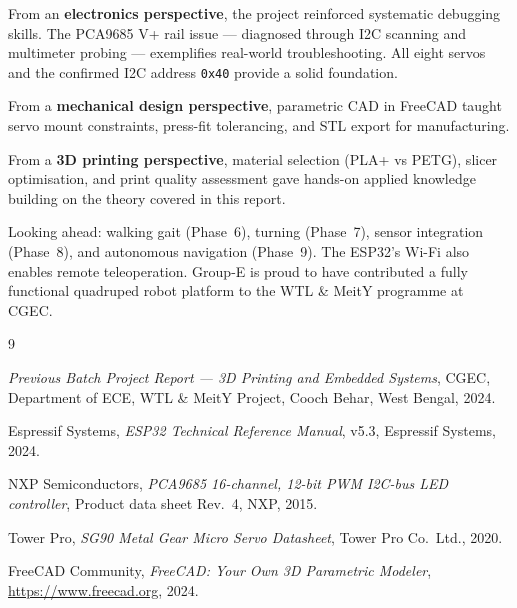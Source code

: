 \documentclass[12pt, a4paper]{article}
\begin{document}
From an \textbf{electronics perspective}, the project reinforced systematic
debugging skills. The PCA9685 V+ rail issue --- diagnosed through I2C scanning
and multimeter probing --- exemplifies real-world troubleshooting. All eight
servos and the confirmed I2C address \texttt{0x40} provide a solid foundation.

From a \textbf{mechanical design perspective}, parametric CAD in FreeCAD taught
servo mount constraints, press-fit tolerancing, and STL export for manufacturing.

From a \textbf{3D printing perspective}, material selection (PLA+ vs PETG),
slicer optimisation, and print quality assessment gave hands-on applied knowledge
building on the theory covered in this report.

Looking ahead: walking gait (Phase~6), turning (Phase~7), sensor integration
(Phase~8), and autonomous navigation (Phase~9). The ESP32's Wi-Fi also enables
remote teleoperation. Group-E is proud to have contributed a fully functional
quadruped robot platform to the WTL \& MeitY programme at CGEC.

\begin{thebibliography}{9}

  \textit{Previous Batch Project Report --- 3D Printing and Embedded Systems},
  CGEC, Department of ECE, WTL \& MeitY Project,
  Cooch Behar, West Bengal, 2024.

  Espressif Systems,
  \textit{ESP32 Technical Reference Manual}, v5.3,
  Espressif Systems, 2024.

  NXP Semiconductors,
  \textit{PCA9685 16-channel, 12-bit PWM I2C-bus LED controller},
  Product data sheet Rev.\ 4, NXP, 2015.

  Tower Pro,
  \textit{SG90 Metal Gear Micro Servo Datasheet},
  Tower Pro Co.\ Ltd., 2020.

  FreeCAD Community,
  \textit{FreeCAD: Your Own 3D Parametric Modeler},
  \url{https://www.freecad.org}, 2024.

\end{thebibliography}
\end{document}
